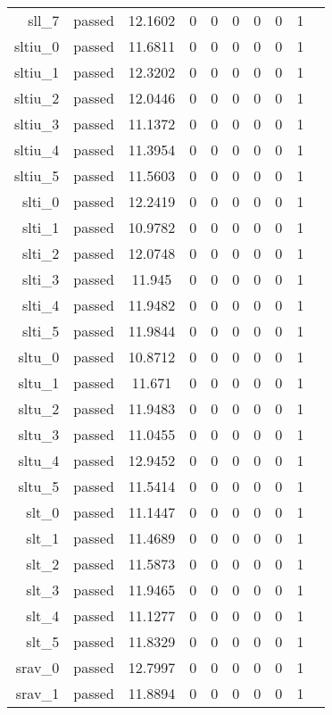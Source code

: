 \begin{longtable}{r|ccccccccc}
    sll\_7 & passed & 12.1602 & 0 & 0 & 0 & 0 & 0 & 1 \\
    sltiu\_0 & passed & 11.6811 & 0 & 0 & 0 & 0 & 0 & 1 \\
    sltiu\_1 & passed & 12.3202 & 0 & 0 & 0 & 0 & 0 & 1 \\
    sltiu\_2 & passed & 12.0446 & 0 & 0 & 0 & 0 & 0 & 1 \\
    sltiu\_3 & passed & 11.1372 & 0 & 0 & 0 & 0 & 0 & 1 \\
    sltiu\_4 & passed & 11.3954 & 0 & 0 & 0 & 0 & 0 & 1 \\
    sltiu\_5 & passed & 11.5603 & 0 & 0 & 0 & 0 & 0 & 1 \\
    slti\_0 & passed & 12.2419 & 0 & 0 & 0 & 0 & 0 & 1 \\
    slti\_1 & passed & 10.9782 & 0 & 0 & 0 & 0 & 0 & 1 \\
    slti\_2 & passed & 12.0748 & 0 & 0 & 0 & 0 & 0 & 1 \\
    slti\_3 & passed & 11.945 & 0 & 0 & 0 & 0 & 0 & 1 \\
    slti\_4 & passed & 11.9482 & 0 & 0 & 0 & 0 & 0 & 1 \\
    slti\_5 & passed & 11.9844 & 0 & 0 & 0 & 0 & 0 & 1 \\
    sltu\_0 & passed & 10.8712 & 0 & 0 & 0 & 0 & 0 & 1 \\
    sltu\_1 & passed & 11.671 & 0 & 0 & 0 & 0 & 0 & 1 \\
    sltu\_2 & passed & 11.9483 & 0 & 0 & 0 & 0 & 0 & 1 \\
    sltu\_3 & passed & 11.0455 & 0 & 0 & 0 & 0 & 0 & 1 \\
    sltu\_4 & passed & 12.9452 & 0 & 0 & 0 & 0 & 0 & 1 \\
    sltu\_5 & passed & 11.5414 & 0 & 0 & 0 & 0 & 0 & 1 \\
    slt\_0 & passed & 11.1447 & 0 & 0 & 0 & 0 & 0 & 1 \\
    slt\_1 & passed & 11.4689 & 0 & 0 & 0 & 0 & 0 & 1 \\
    slt\_2 & passed & 11.5873 & 0 & 0 & 0 & 0 & 0 & 1 \\
    slt\_3 & passed & 11.9465 & 0 & 0 & 0 & 0 & 0 & 1 \\
    slt\_4 & passed & 11.1277 & 0 & 0 & 0 & 0 & 0 & 1 \\
    slt\_5 & passed & 11.8329 & 0 & 0 & 0 & 0 & 0 & 1 \\
    srav\_0 & passed & 12.7997 & 0 & 0 & 0 & 0 & 0 & 1 \\
    srav\_1 & passed & 11.8894 & 0 & 0 & 0 & 0 & 0 & 1 \\

\end{longtable}
